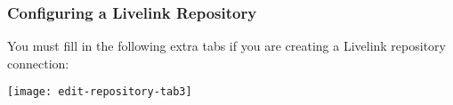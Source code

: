 %
%

\subsubsection{Configuring a Livelink Repository}

You must fill in the following extra tabs if you are creating a
Livelink repository connection:

\texttt{[image: edit-repository-tab3]}

